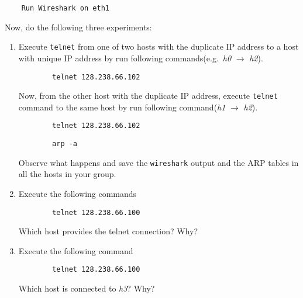 \documentclass{UTNetLab}
\begin{document}
\begin{lstlisting}
    Run Wireshark on eth1
\end{lstlisting}
Now, do the following three experiments:
    \begin{enumerate}
        \item Execute \lstinline{telnet} from one of two hosts with the duplicate IP address to a host with unique IP address by run following commands(e.g.\ \textit{h0} $\rightarrow$ \textit{h2}).
        
        \begin{lstlisting}
        telnet 128.238.66.102
        \end{lstlisting}
        
        Now, from the other host with the duplicate IP address, execute \lstinline{telnet} command to the same host by run following command(\textit{h1} $\rightarrow$ \textit{h2}).
        
        \begin{lstlisting}
        telnet 128.238.66.102
        \end{lstlisting}
        
        \begin{lstlisting}
        arp -a
        \end{lstlisting}
        
        Observe what happens and save the \lstinline{wireshark} output and the ARP tables in all the hosts in your group.
        
        \item Execute the following commands
        
        \begin{lstlisting}
        telnet 128.238.66.100
        \end{lstlisting}
        
        Which host provides the telnet connection? Why?
        
        \item Execute the following command 
        
        \begin{lstlisting}
        telnet 128.238.66.100
        \end{lstlisting}
 
         Which host is connected to \textit{h3}? Why?
    \end{enumerate}
    
\end{document}
